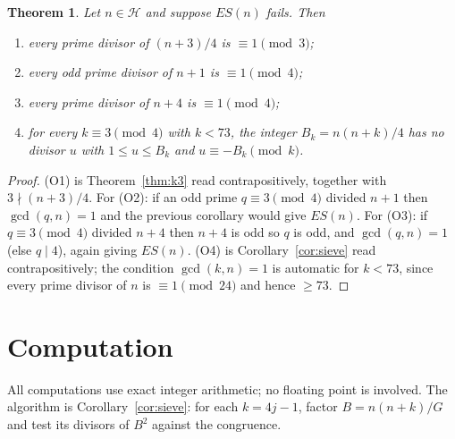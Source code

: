 \documentclass[11pt,a4paper]{article}
\newtheorem{theorem}{Theorem}
\theoremstyle{definition}
\begin{document}
\begin{theorem}\label{thm:obstr}
Let $n\in\mathcal H$ and suppose $ES(n)$ fails. Then
\begin{enumerate}
\item[(O1)] every prime divisor of $(n+3)/4$ is $\equiv 1\pmod 3$;
\item[(O2)] every odd prime divisor of $n+1$ is $\equiv 1\pmod 4$;
\item[(O3)] every prime divisor of $n+4$ is $\equiv 1\pmod 4$;
\item[(O4)] for every $k\equiv 3\pmod 4$ with $k<73$, the integer
  $B_k=n(n+k)/4$ has no divisor $u$ with $1\le u\le B_k$ and
  $u\equiv -B_k\pmod k$.
\end{enumerate}
\end{theorem}
\begin{proof}
(O1) is Theorem~\ref{thm:k3} read contrapositively, together with
$3\nmid (n+3)/4$. For (O2): if an odd prime $q\equiv 3\pmod 4$ divided $n+1$
then $\gcd(q,n)=1$ and the previous corollary would give $ES(n)$. For (O3): if
$q\equiv 3\pmod 4$ divided $n+4$ then $n+4$ is odd so $q$ is odd, and
$\gcd(q,n)=1$ (else $q\mid 4$), again giving $ES(n)$. (O4) is
Corollary~\ref{cor:sieve} read contrapositively; the condition $\gcd(k,n)=1$ is
automatic for $k<73$, since every prime divisor of $n$ is $\equiv 1\pmod{24}$
and hence $\ge 73$.
\end{proof}

\section{Computation}\label{sec:comp}

All computations use exact integer arithmetic; no floating point is involved.
The algorithm is Corollary~\ref{cor:sieve}: for each $k=4j-1$, factor
$B=n(n+k)/G$ and test its divisors of $B^{2}$ against the congruence.
\end{document}
